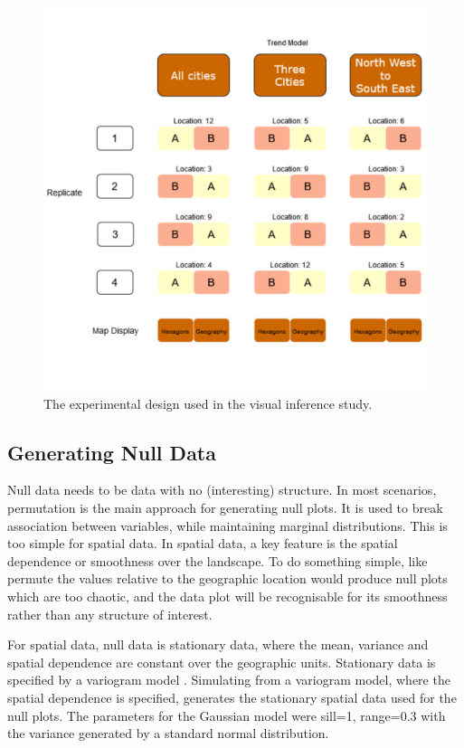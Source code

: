 \documentclass[12pt]{article}
\begin{document}
\begin{figure}
\includegraphics[width=1\linewidth]{kobakiancook_files/figure-latex/exp-design-1} \caption{The experimental design used in the visual inference study.}\label{fig:exp-design}
\end{figure}

\subsection{Generating Null Data}
\label{sec:gnd}

Null data needs to be data with no (interesting) structure. In most
scenarios, permutation is the main approach for generating null plots.
It is used to break association between variables, while maintaining
marginal distributions. This is too simple for spatial data. In spatial
data, a key feature is the spatial dependence or smoothness over the
landscape. To do something simple, like permute the values relative to
the geographic location would produce null plots which are too chaotic,
and the data plot will be recognisable for its smoothness rather than
any structure of interest.

For spatial data, null data is stationary data, where the mean, variance
and spatial dependence are constant over the geographic units.
Stationary data is specified by a variogram model \citep{POG}.
Simulating from a variogram model, where the spatial dependence is
specified, generates the stationary spatial data used for the null
plots. The parameters for the Gaussian model were sill=1, range=0.3 with
the variance generated by a standard normal distribution.
\end{document}
